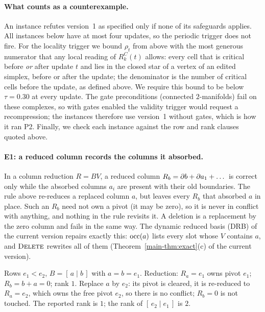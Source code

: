 \paragraph{What counts as a counterexample.}
An instance refutes version~1 as specified only if none of its safeguards
applies. All instances below have at most four updates, so the periodic trigger
does not fire. For the locality trigger we bound $\rho_t$ from above with the
most generous numerator that any local reading of $R_k^C(t)$ allows: every cell
that is critical before \emph{or} after update $t$ and lies in the closed star of
a vertex of an edited simplex, before or after the update; the denominator is
the number of critical cells before the update, as defined above. We require
this bound to be below $\tau=0.30$ at every update. The gate preconditions
(connected $2$-manifolds) fail on these complexes, so with gates enabled the
validity trigger would request a recompression; the instances therefore use
version~1 without gates, which is how it ran P2. Finally, we
check each instance against the row and rank clauses quoted above.

\paragraph{E1: a reduced column records the columns it absorbed.}
In a column reduction $R=BV$, a reduced column $R_b=\partial b+\partial a_1+\dots$ is
correct only while the absorbed columns $a_i$ are present with their old
boundaries. The rule above re-reduces a replaced column $a$, but leaves every
$R_b$ that absorbed $a$ in place. Such an $R_b$ need not own a pivot (it may be
zero), so it is never in conflict with anything, and nothing in the rule
revisits it. A deletion is a replacement by the zero column and fails in the
same way. The dynamic reduced basis (DRB) of the current version repairs exactly this: $\operatorname{occ}(a)$ lists every slot whose $V$
contains $a$, and $\textup{\textsc{Delete}}$ rewrites all of them (Theorem~\ref{main-thm:exact}(c) of the current version).

\begin{example}\label{ex:e1-matrix}
Rows $e_1<e_2$, $B=[\,a\mid b\,]$ with $a=b=e_1$. Reduction: $R_a=e_1$ owns pivot
$e_1$; $R_b=b+a=0$; rank $1$. Replace $a$ by $e_2$: its pivot is cleared, it is
re-reduced to $R_a=e_2$, which owns the free pivot $e_2$, so there is no
conflict; $R_b=0$ is not touched. The reported rank is $1$; the rank of
$[\,e_2\mid e_1\,]$ is $2$.
\end{example}

